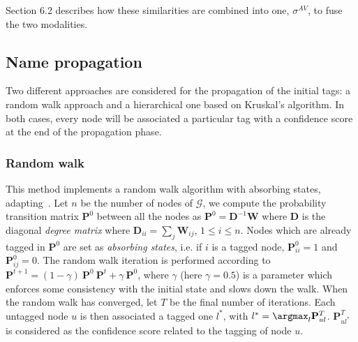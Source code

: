 Section 6.2 describes how these similarities are combined into one, $\sigma^{AV}$, to fuse the two modalities.

\subsection{Name propagation}

Two different approaches are considered for the propagation of the initial tags: a random walk approach and a hierarchical one based on Kruskal's algorithm. In both cases, every node will be associated a particular tag with a confidence score at the end of the propagation phase.

\subsubsection{Random walk}

This method implements a random walk algorithm with absorbing states, adapting~\cite{zhu2002}. Let $n$ be the number of nodes of $\mathcal{G}$, we compute the probability transition matrix $\mathbf{P}^0$ between all the nodes as $\mathbf{P}^0 = \mathbf{D}^{-1}\mathbf{W}$ where $\mathbf{D}$ is the diagonal {\it degree matrix} where $\mathbf{D}_{ii} = \sum_j \mathbf{W}_{ij}$, $1\leq i \leq n$. Nodes which are already tagged in $\mathbf{P}^0$ are set as \textit{absorbing states}, i.e. if $i$ is a tagged node, $\mathbf{P}^0_{ii} = 1$ and $\mathbf{P}^0_{ij} = 0$. The random walk iteration is performed according to $\mathbf{P}^{t+1} = (1-\gamma) ~\mathbf{P}^0 ~ \mathbf{P}^{t} + \gamma ~\mathbf{P}^0$, where $\gamma$ (here $\gamma = 0.5$) is a parameter which enforces some consistency with the initial state and slows down the walk. When the random walk has converged, let $T$ be the final number of iterations. Each untagged node $u$ is then associated a tagged one $l^*$, with $l^*=\argmax_l{\mathbf{P}^{T}_{ul}}$. $\mathbf{P}^{T}_{ul^*}$ is considered as the confidence score related to the tagging of node $u$.

